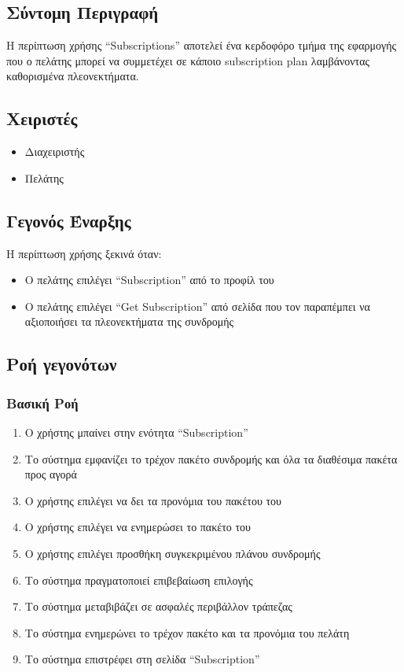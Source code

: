 \documentclass[12pt,a4paper,twoside]{book}
\begin{document}
\subsection{Σύντομη Περιγραφή}
Η περίπτωση χρήσης “Subscriptions” αποτελεί ένα κερδοφόρο τμήμα της εφαρμογής που ο πελάτης μπορεί να συμμετέχει σε κάποιο subscription plan λαμβάνοντας καθορισμένα πλεονεκτήματα. %

\subsection{Χειριστές}
\begin{itemize}
  \item Διαχειριστής
  \item Πελάτης
\end{itemize}

\subsection{Γεγονός Έναρξης}
Η περίπτωση χρήσης ξεκινά όταν:
\begin{itemize}
  \item Ο πελάτης επιλέγει “Subscription” από το προφίλ του   %
  \item Ο πελάτης επιλέγει “Get Subscription” από σελίδα που τον παραπέμπει να αξιοποιήσει τα πλεονεκτήματα της συνδρομής %
\end{itemize}

\subsection{Ροή γεγονότων}

\subsubsection{Βασική Ροή}
\begin{enumerate}
  \item Ο χρήστης μπαίνει στην ενότητα “Subscription”  %
  \item Το σύστημα εμφανίζει το τρέχον πακέτο συνδρομής και όλα τα διαθέσιμα πακέτα προς αγορά  %
  \item Ο χρήστης επιλέγει να δει τα προνόμια του πακέτου του   %
  \item O χρήστης επιλέγει να ενημερώσει το πακέτο του %
  \item Ο χρήστης επιλέγει προσθήκη συγκεκριμένου πλάνου συνδρομής   %
  \item Το σύστημα πραγματοποιεί επιβεβαίωση επιλογής   %
  \item Το σύστημα μεταβιβάζει σε ασφαλές περιβάλλον τράπεζας   %
  \item Το σύστημα ενημερώνει το τρέχον πακέτο και τα προνόμια του πελάτη   %
  \item Το σύστημα επιστρέφει στη σελίδα “Subscription”  %
\end{enumerate}
\end{document}
